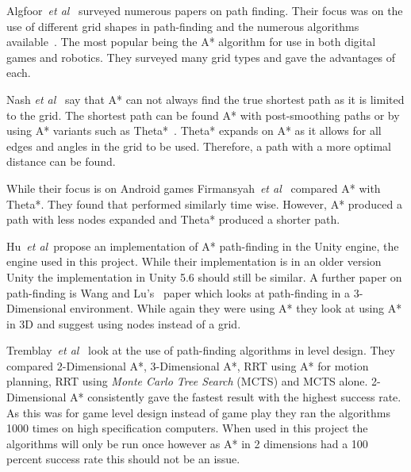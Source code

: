 \documentclass[journal]{IEEEtran}
\begin{document}
Algfoor~\textit{et al}~\cite{Algfoor2015} surveyed numerous papers on path finding. Their focus was on the use of different grid shapes in path-finding and the numerous algorithms available~\cite{Algfoor2015}. The most popular being the A* algorithm for use in both digital games and robotics. They surveyed many grid types and gave the advantages of each. 

Nash \textit{et al}~\cite{Nash2007} say that A* can not always find the true shortest path as it is limited to the grid. The shortest path can be found A* with post-smoothing paths or by using A* variants such as Theta*~\cite{Nash2007,Firmansyah2016}. Theta* expands on A* as it allows for all edges and angles in the grid to be used. Therefore, a path with a more optimal distance can be found.

While their focus is on Android games Firmansyah~\textit{et al}~\cite{Firmansyah2016} compared A* with Theta*. They found that performed similarly time wise. However, A* produced a path with less nodes expanded and Theta* produced a shorter path. 

Hu~\textit{et al}~\cite{Hu2012}propose an implementation of A* path-finding in the Unity engine, the engine used in this project.  While their implementation is in an older version Unity the implementation in Unity 5.6 should still be similar. A further paper on path-finding is Wang and Lu's~\cite{wang2012} paper which looks at path-finding in a 3-Dimensional environment. While again they were using A* they look at using A* in 3D and suggest using nodes instead of a grid.

Tremblay~\textit{et al}~\cite{Tremblay2014} look at the use of path-finding algorithms in level design. They compared 2-Dimensional A*, 3-Dimensional A*, RRT using A* for motion planning, RRT using \textit{Monte Carlo Tree Search} (MCTS) and MCTS alone. 2-Dimensional A* consistently gave the fastest result with the highest success rate. As this was for game level design instead of game play they ran the algorithms 1000 times on high specification computers. When used in this project the algorithms will only be run once however as A* in 2 dimensions had a 100 percent success rate this should not be an issue. 
\end{document}
